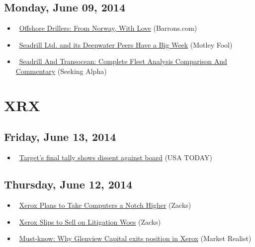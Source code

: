 \documentclass[11pt,asymmetric]{article}
\begin{document}
\subsection*{Monday, June 09, 2014}
\begin{itemize}
\item\ \href{http://blogs.barrons.com/stockstowatchtoday/2014/06/09/offshore-drillers-from-norway-with-love/?mod=yahoobarrons&ru=yahoo}{Offshore Drillers: From Norway, With Love} (Barrons.com)
\item\ \href{http://www.fool.com/investing/general/2014/06/09/seadrill-ltd-and-its-deepwater-peers-have-a-big-we.aspx?source=eogyholnk0000001}{Seadrill Ltd. and its Deepwater Peers Have a Big Week} (Motley Fool)
\item\ \href{http://seekingalpha.com/article/2258143-seadrill-and-transocean-complete-fleet-analysis-comparison-and-commentary?source=yahoo}{Seadrill And Transocean: Complete Fleet Analysis Comparison And Commentary} (Seeking Alpha)
\end{itemize}

\section*{XRX}

\subsection*{Friday, June 13, 2014}
\begin{itemize}
\item\ \href{http://www.usatoday.com/story/money/business/2014/06/13/targets-final-tally-shows-dissent-against-board/10500429/}{Target's final tally shows dissent against board} (USA TODAY)
\end{itemize}
\subsection*{Thursday, June 12, 2014}
\begin{itemize}
\item\ \href{http://finance.yahoo.com/news/xerox-plans-computers-notch-higher-173004276.html}{Xerox Plans to Take Computers a Notch Higher} (Zacks)
\item\ \href{http://finance.yahoo.com/news/xerox-slips-sell-litigation-woes-161008438.html}{Xerox Slips to Sell on Litigation Woes} (Zacks)
\item\ \href{http://finance.yahoo.com/news/must-know-why-glenview-capital-130002700.html}{Must-know: Why Glenview Capital exits position in Xerox} (Market Realist)
\end{itemize}
\end{document}
